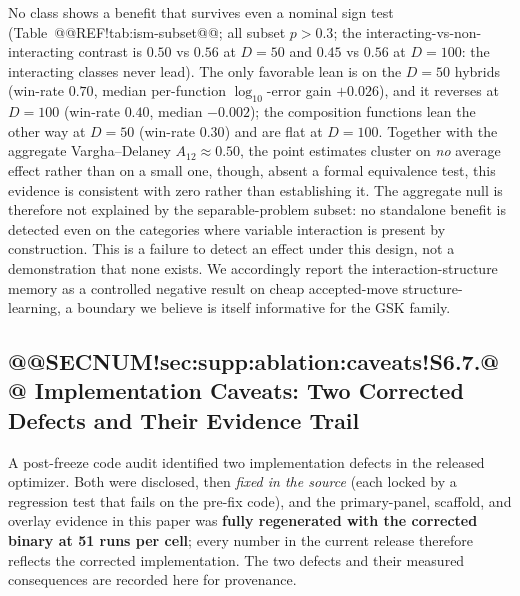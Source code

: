 \documentclass[10pt,a4paper]{article}
\begin{document}
No class shows a benefit that survives even a nominal sign test
(Table~@@REF!tab:ism-subset@@; all subset
$p > 0.3$; the interacting-vs-non-interacting contrast is $0.50$ vs $0.56$ at $D=50$
and $0.45$ vs $0.56$ at $D=100$: the interacting classes never lead).  The only
favorable lean is on the
$D=50$ hybrids (win-rate $0.70$, median per-function $\log_{10}$-error gain $+0.026$),
and it reverses at $D=100$ (win-rate $0.40$, median $-0.002$); the
composition functions lean the other way at $D=50$ (win-rate $0.30$) and are flat
at $D=100$.  Together with the aggregate
Vargha--Delaney $A_{12}\approx 0.50$, the point estimates cluster on \emph{no}
average effect rather than on a small one, though, absent a formal equivalence
test, this evidence is consistent with zero rather than establishing it.  The aggregate null is therefore not explained by the separable-problem
subset: no standalone benefit is detected even on the categories where variable
interaction is present by construction. This is a failure to detect an effect
under this design, not a demonstration that none exists.  We accordingly report the
interaction-structure memory as a controlled negative result on cheap accepted-move
structure-learning, a boundary we believe is itself informative for the GSK family.




\subsection{@@SECNUM!sec:supp:ablation:caveats!S6.7.@@ Implementation Caveats: Two Corrected Defects and Their Evidence Trail}\label{sec:supp:ablation:caveats}

A post-freeze code audit identified two implementation defects in the released
optimizer.  Both were disclosed, then \emph{fixed in the source} (each locked by a
regression test that fails on the pre-fix code), and the primary-panel, scaffold, and
overlay evidence in this paper was \textbf{fully regenerated with the corrected
binary at 51 runs per cell}; every number in the current release therefore reflects
the corrected implementation.  The two defects and their measured consequences are
recorded here for provenance.
\end{document}
